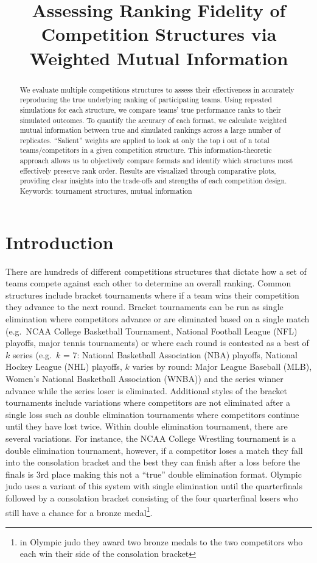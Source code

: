 \documentclass[
  12pt,
]{article}
\title{\large Assessing Ranking Fidelity of Competition Structures via
Weighted Mutual Information}
\author{}
\date{\vspace{-2.5em}}
\begin{document}
\maketitle
\begin{abstract}
We evaluate multiple competitions structures to assess their
effectiveness in accurately reproducing the true underlying ranking of
participating teams. Using repeated simulations for each structure, we
compare teams' true performance ranks to their simulated outcomes. To
quantify the accuracy of each format, we calculate weighted mutual
information between true and simulated rankings across a large number of
replicates. ``Salient'' weights are applied to look at only the top i
out of n total teams/competitors in a given competition structure. This
information-theoretic approach allows us to objectively compare formats
and identify which structures most effectively preserve rank order.
Results are visualized through comparative plots, providing clear
insights into the trade-offs and strengths of each competition design.\\

\vspace{2mm} \textbar{} Keywords: tournament structures, mutual
information
\end{abstract}

\section{Introduction}\label{introduction}

There are hundreds of different competitions structures that dictate how
a set of teams compete against each other to determine an overall
ranking. Common structures include bracket tournaments where if a team
wins their competition they advance to the next round. Bracket
tournaments can be run as single elimination where competitors advance
or are eliminated based on a single match (e.g.~NCAA College Basketball
Tournament, National Football League (NFL) playoffs, major tennis
tournaments) or where each round is contested as a best of \(k\) series
(e.g.~\(k\) = 7: National Basketball Association (NBA) playoffs,
National Hockey League (NHL) playoffs, \(k\) varies by round: Major
League Baseball (MLB), Women's National Basketball Association (WNBA))
and the series winner advance while the series loser is eliminated.
Additional styles of the bracket tournaments include variations where
competitors are not eliminated after a single loss such as double
elimination tournaments where competitors continue until they have lost
twice. Within double elimination tournament, there are several
variations. For instance, the NCAA College Wrestling tournament is a
double elimination tournament, however, if a competitor loses a match
they fall into the consolation bracket and the best they can finish
after a loss before the finals is 3rd place making this not a ``true''
double elimination format. Olympic judo uses a variant of this system
with single elimination until the quarterfinals followed by a
consolation bracket consisting of the four quarterfinal losers who still
have a chance for a bronze medal\footnote{in Olympic judo they award two
  bronze medals to the two competitors who each win their side of the
  consolation bracket}.
\end{document}

